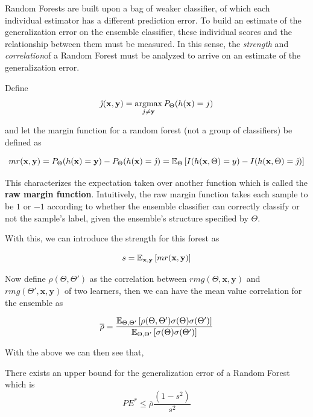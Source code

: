 Random Forests are built upon a bag of weaker classifier, of which each individual estimator has a different prediction error.
To build an estimate of the generalization error on the ensemble classifier, these individual scores and the relationship between them must be measured.
In this sense, the \textit{strength} and \textit{correlation}of a Random Forest must be analyzed to arrive on an estimate of the generalization error.

Define $$\hat{\jmath}( \textbf{x},\textbf{y}) = \operatorname*{argmax}_{j \neq \textbf{y}} P_{\Theta}(h(\textbf{x}) = j)$$

and let the margin function for a random forest (not a group of classifiers) be defined as

\[
mr(\textbf{x},\textbf{y}) = P_{\Theta}(h(\textbf{x}) = \textbf{y}) - P_{\Theta}(h(\textbf{x}) = \hat{\jmath})
\\
= \operatorname{\mathbb{E}}_{\Theta} \left[ I(h(\textbf{x},\Theta ) = y ) - I( h( \textbf{x},\Theta ) = \hat{\jmath} ) \right]
\]

This characterizes the expectation taken over another function which is called the \textbf{raw margin function}.
Intuitively, the raw margin function takes each sample to be $1$ or $-1$ according to whether the ensemble classifier can correctly classify or not the sample's label, given the ensemble's structure specified by $\Theta$.

With this, we can introduce the strength for this forest as

\begin{equation}
s = \operatorname{\mathbb{E}}_{\textbf{x},\textbf{y}} \left[ mr(\textbf{x},\textbf{y} ) \right]
\end{equation}

Now define $ \rho(\Theta, \Theta')$ as the correlation between $rmg(\Theta,\textbf{x},\textbf{y})$ and $rmg(\Theta',\textbf{x},\textbf{y})$ of two learners, then we can have the mean value correlation for the ensemble as

\begin{equation}
\overline{\rho} = \frac{\operatorname{\mathbb{E}}_{\Theta, \Theta'} \left[ \rho(\Theta, \Theta') \sigma(\Theta) \sigma(\Theta')\right]}
{\operatorname{\mathbb{E}}_{\Theta, \Theta'} \left[ \sigma(\Theta) \sigma(\Theta')\right]}
\end{equation}

With the above we can then see that,

\begin{theorem}
There exists an upper bound for the generalization error of a Random Forest which is    \begin{equation}
PE^* \leq \overline{\rho}\frac{(1-s^2)}{s^2}
\end{equation}
\end{theorem}

